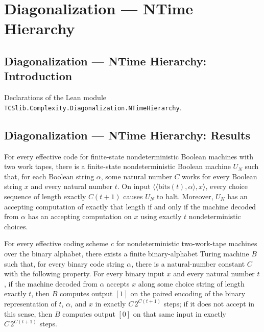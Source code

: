 \section{Diagonalization --- NTime Hierarchy}
\subsection*{Diagonalization --- NTime Hierarchy: Introduction}

Declarations of the Lean module \texttt{TCSlib.Complexity.Diagonalization.NTimeHierarchy}.

\subsection*{Diagonalization --- NTime Hierarchy: Results}

\begin{theorem}
\label{Turing.exists_timed_universal_NDTM}
\leanok
{}
For every effective code for finite-state nondeterministic Boolean machines with two
work tapes, there is a finite-state nondeterministic Boolean machine $U_N$ such that,
for each Boolean string $\alpha$, some natural number $C$ works for every Boolean string
$x$ and every natural number $t$. On input
$\langle\langle\mathrm{bits}(t),\alpha\rangle,x\rangle$, every choice sequence of length
exactly $C(t+1)$ causes $U_N$ to halt. Moreover, $U_N$ has an accepting computation of
exactly that length if and only if the machine decoded from $\alpha$ has an accepting
computation on $x$ using exactly $t$ nondeterministic choices.
\end{theorem}

\begin{theorem}
\label{Turing.exists_ndAcceptsWithin_decider}
\leanok
{}
For every effective coding scheme $c$ for nondeterministic two-work-tape machines over
the binary alphabet, there exists a finite binary-alphabet Turing machine $B$ such that,
for every binary code string $\alpha$, there is a natural-number constant $C$ with the
following property. For every binary input $x$ and every natural number $t$, if the
machine decoded from $\alpha$ accepts $x$ along some choice string of length exactly
$t$, then $B$ computes output $[1]$ on the paired encoding of the binary representation
of $t$, $\alpha$, and $x$ in exactly $C\,2^{C(t+1)}$ steps; if it does not accept in
this sense, then $B$ computes output $[0]$ on that same input in exactly $C\,2^{C(t+1)}$
steps.
\end{theorem}

